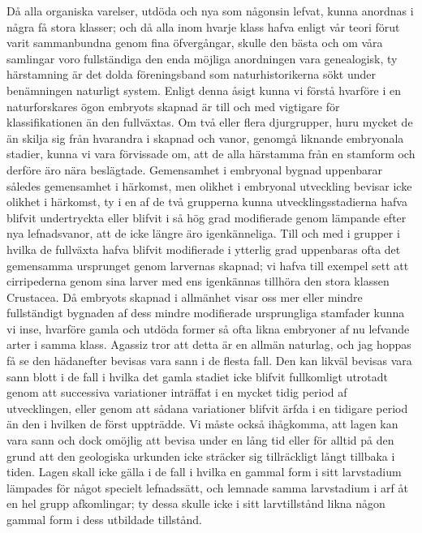 Då alla organiska varelser, utdöda och nya som någonsin lefvat, kunna anordnas i några få stora klasser; och då alla inom hvarje klass hafva enligt vår teori förut varit sammanbundna genom fina öfvergångar, skulle den bästa och om våra samlingar voro fullständiga den enda möjliga anordningen vara genealogisk, ty härstamning är det dolda föreningsband som naturhistorikerna sökt under benämningen naturligt system. Enligt denna åsigt kunna vi förstå hvarföre i en naturforskares ögon embryots skapnad är till och med vigtigare för klassifikationen än den fullväxtas. Om två eller flera djurgrupper, huru mycket de än skilja sig från hvarandra i skapnad och vanor, genomgå liknande embryonala stadier, kunna vi vara förvissade om, att de alla härstamma från en stamform och derföre äro nära beslägtade. Gemensamhet i embryonal bygnad uppenbarar således gemensamhet i härkomst, men olikhet i embryonal utveckling bevisar icke olikhet i härkomst, ty i en af de två grupperna kunna utvecklingsstadierna hafva blifvit undertryckta eller blifvit i så hög grad modifierade genom lämpande efter nya lefnadsvanor, att de icke längre äro igenkänneliga. Till och med i grupper i hvilka de fullväxta hafva blifvit modifierade i ytterlig grad uppenbaras ofta det gemensamma ursprunget genom larvernas skapnad; vi hafva till exempel sett att cirripederna genom sina larver med ens igenkännas tillhöra den stora klassen Crustacea. Då embryots skapnad i allmänhet visar oss mer eller mindre fullständigt bygnaden af dess mindre modifierade ursprungliga stamfader kunna vi inse, hvarföre gamla och utdöda former så ofta likna embryoner af nu lefvande arter i samma klass. Agassiz tror att detta är en allmän naturlag, och jag hoppas få se den hädanefter bevisas vara sann i de flesta fall. Den kan likväl bevisas vara sann blott i de fall i hvilka det gamla stadiet icke blifvit fullkomligt utrotadt genom att successiva variationer inträffat i en mycket tidig period af utvecklingen, eller genom att sådana variationer blifvit ärfda i en tidigare period än den i hvilken de först uppträdde. Vi måste också ihågkomma, att lagen kan vara sann och dock omöjlig att bevisa under en lång tid eller för alltid på den grund att den geologiska urkunden icke sträcker sig tillräckligt långt tillbaka i tiden. Lagen skall icke gälla i de fall i hvilka en gammal form i sitt larvstadium lämpades för något specielt lefnadssätt, och lemnade samma larvstadium i arf åt en hel grupp afkomlingar; ty dessa skulle icke i sitt larvtillstånd likna någon gammal form i dess utbildade tillstånd.

